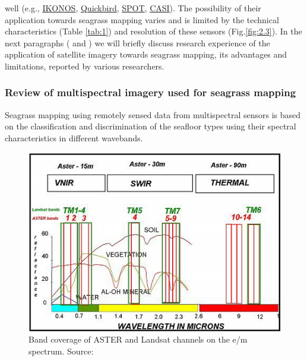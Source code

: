 \documentclass[11pt]{article}
\begin{document}
well (e.g., \href{http://www.satimagingcorp.com/gallery-ikonos.html}{IKONOS}, \href{http://www.digitalglobe.com/index.php/85/QuickBird}{Quickbird}, \href{http://www.spotimage.fr/}{SPOT}, \href{http://www.itres.com/products/imagers/casi550}{CASI}). The possibility of their application towards seagrass mapping varies and is limited by the technical characteristics (Table \ref{tab:1}) and resolution of these sensors  (Fig.\ref{fig:2.3}).
In the next paragraphs ( and ) we will briefly discuss research experience of the application of satellite imagery towards seagrass mapping, its advantages and limitations, reported by various researchers.

\subsubsection[Review of multispectral imagery...]{Review of multispectral imagery used for seagrass mapping}\label{sec:2.4.1} 
Seagrass mapping using remotely sensed data from multispectral sensors is based on the classification
and discrimination of the seafloor types using their spectral characteristics in different wavebands.

\begin{figure}
	\centering
	\includegraphics[scale=0.35]{Fig-13.jpg}
 	\caption{Band coverage of ASTER and Landsat channels on the e/m spectrum. Source:\cite{Kalinowski04}\label{Kalinowski04}}
	\label{fig:2.4}
\end{figure}
\end{document}

